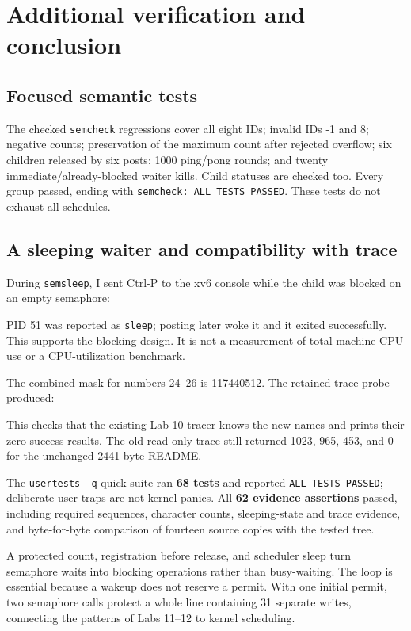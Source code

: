 \documentclass[12pt]{article}
\begin{document}
\clearpage
\section{Additional verification and conclusion}
\subsection{Focused semantic tests}
The checked \texttt{semcheck} regressions cover all eight IDs; invalid
IDs -1 and 8; negative counts; preservation of the maximum count after
rejected overflow; six children released by six posts; 1000 ping/pong
rounds; and twenty immediate/already-blocked waiter kills. Child statuses
are checked too. Every group passed, ending with
\texttt{semcheck: ALL TESTS PASSED}. These tests do not exhaust all schedules.

\subsection{A sleeping waiter and compatibility with trace}
During \texttt{semsleep}, I sent Ctrl-P to the xv6 console while the child
was blocked on an empty semaphore:

PID 51 was reported as \texttt{sleep}; posting later woke it and it exited
successfully. This supports the blocking design. It is not a measurement
of total machine CPU use or a CPU-utilization benchmark.

The combined mask for numbers 24--26 is 117440512. The retained trace
probe produced:

This checks that the existing Lab 10 tracer knows the new names and prints
their zero success results. The old read-only trace still returned
1023, 965, 453, and 0 for the unchanged 2441-byte README.

The \texttt{usertests -q} quick suite ran \textbf{68 tests} and reported
\texttt{ALL TESTS PASSED}; deliberate user traps are not kernel panics.
All \textbf{62 evidence assertions} passed, including required sequences,
character counts, sleeping-state and trace evidence, and byte-for-byte
comparison of fourteen source copies with the tested tree.

A protected count, registration before release, and scheduler sleep turn
semaphore waits into blocking operations rather than busy-waiting. The
loop is essential because a wakeup does not reserve a permit. With one
initial permit, two semaphore calls protect a whole line containing 31
separate writes, connecting the patterns of Labs 11--12 to kernel scheduling.
\end{document}
